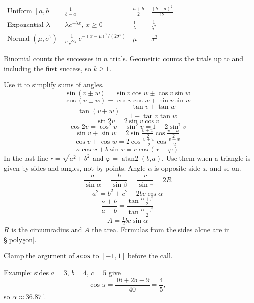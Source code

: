 {\begin{tabular}{@{}p{2.6cm} p{3.0cm} l l@{}}
\end{tabular}\par\nointerlineskip
\noindent\begin{tabular}{@{}p{2.6cm} p{3.0cm} l l@{}}
Uniform $[a, b]$ & $\frac{1}{b - a}$ & $\frac{a + b}{2}$ & $\frac{(b - a)^2}{12}$ \\
Exponential $\lambda$ & $\lambda e^{-\lambda x}$, $x \ge 0$ & $\frac{1}{\lambda}$ & $\frac{1}{\lambda^2}$ \\
Normal $(\mu, \sigma^2)$ & $\frac{1}{\sigma \sqrt{2\pi}} e^{-(x - \mu)^2 / (2\sigma^2)}$ & $\mu$ & $\sigma^2$ \\
\bottomrule
\end{tabular}
\par\smallskip
Binomial counts the successes in $n$ trials. Geometric counts the trials up to and including the first success, so $k \ge 1$.
}
\label{mathtrig}
{\footnotesize\tightdisplay
{}
Use it to simplify sums of angles.
\[ \sin(v \pm w) = \sin v \cos w \pm \cos v \sin w \]
\[ \cos(v \pm w) = \cos v \cos w \mp \sin v \sin w \]
\[ \tan(v + w) = \frac{\tan v + \tan w}{1 - \tan v \tan w} \]
\[ \sin 2v = 2 \sin v \cos v \]
\[ \cos 2v = \cos^2 v - \sin^2 v = 1 - 2 \sin^2 v \]
\[ \sin v + \sin w = 2 \sin \tfrac{v + w}{2} \cos \tfrac{v - w}{2} \]
\[ \cos v + \cos w = 2 \cos \tfrac{v + w}{2} \cos \tfrac{v - w}{2} \]
\[ a \cos x + b \sin x = r \cos(x - \varphi) \]
In the last line $r = \sqrt{a^2 + b^2}$ and $\varphi = \operatorname{atan2}(b, a)$.
Use them when a triangle is given by sides and angles, not by points. Angle $\alpha$ is opposite side $a$, and so on.
\[ \frac{a}{\sin \alpha} = \frac{b}{\sin \beta} = \frac{c}{\sin \gamma} = 2R \]
\[ a^2 = b^2 + c^2 - 2bc \cos \alpha \]
\[ \frac{a + b}{a - b} = \frac{\tan \frac{\alpha + \beta}{2}}{\tan \frac{\alpha - \beta}{2}} \]
\[ A = \tfrac{1}{2} bc \sin \alpha \]
$R$ is the circumradius and $A$ the area. Formulas from the sides alone are in \S\ref{polygon}.\par
Clamp the argument of \texttt{acos} to $[-1, 1]$ before the call.\par
Example: sides $a = 3$, $b = 4$, $c = 5$ give
\[ \cos \alpha = \frac{16 + 25 - 9}{40} = \frac{4}{5}, \]
so $\alpha \approx 36.87^\circ$.
}
